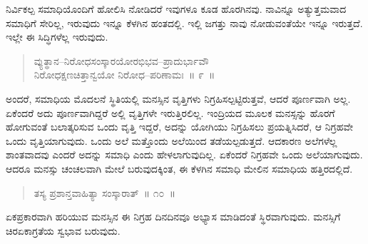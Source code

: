 \vspace{-0.4cm}


\vspace{0.1cm}

ನಿರ್ವಿಕಲ್ಪ ಸಮಾಧಿಯೊಂದಿಗೆ ಹೋಲಿಸಿ ನೋಡಿದರೆ ಇವುಗಳೂ ಕೂಡ ಹೊರಗಿನವು. ನಾವಿನ್ನೂ ಅತ್ಯುತ್ತಮವಾದ ಸಮಾಧಿಗೆ ಸೇರಿಲ್ಲ, ಇರುವುದು ಇನ್ನೂ ಕೆಳಗಿನ ಹಂತದಲ್ಲಿ. ಇಲ್ಲಿ ಜಗತ್ತು ನಾವು ನೋಡುವಂತೆಯೇ ಇನ್ನೂ ಇರುತ್ತದೆ. ಇಲ್ಲೇ ಈ ಸಿದ್ಧಿಗಳೆಲ್ಲ ಇರುವುದು. 

\vspace{-0.3cm}

\begin{verse}
ವ್ಯುತ್ಥಾನ–ನಿರೋಧಸಂಸ್ಕಾರಯೋರಭಿಭವ–ಪ್ರಾದುರ್ಭಾವೌ\\ನಿರೋಧಕ್ಷಣಚಿತ್ತಾನ್ವಯೋ ನಿರೋಧ–ಪರಿಣಾಮಃ~॥ ೯~॥
\end{verse}

\vspace{-0.35cm}


\vspace{0.1cm}

ಅಂದರೆ, ಸಮಾಧಿಯ ಮೊದಲನೆ ಸ್ಥಿತಿಯಲ್ಲಿ ಮನಸ್ಸಿನ ವೃತ್ತಿಗಳು ನಿಗ್ರಹಿಸಲ್ಪಟ್ಟಿರುತ್ತವೆ, ಆದರೆ ಪೂರ್ಣವಾಗಿ ಅಲ್ಲ. ಏಕೆಂದರೆ ಅದು ಪೂರ್ಣವಾಗಿದ್ದರೆ ಅಲ್ಲಿ ವೃತ್ತಿಗಳೇ ಇರುತ್ತಿರಲಿಲ್ಲ. ಇಂದ್ರಿಯದ ಮೂಲಕ ಮನಸ್ಸನ್ನು ಹೊರಗೆ ಹೋಗುವಂತೆ ಬಲಾತ್ಕರಿಸುವ ಒಂದು ವೃತ್ತಿ ಇದ್ದರೆ, ಅದನ್ನು ಯೋಗಿಯು ನಿಗ್ರಹಿಸಲು ಪ್ರಯತ್ನಿಸಿದರೆ, ಆ ನಿಗ್ರಹವೇ ಒಂದು ವೃತ್ತಿಯಾಗುವುದು. ಒಂದು ಅಲೆ ಮತ್ತೊಂದು ಅಲೆಯಿಂದ ತಡೆಯಲ್ಪಡುತ್ತದೆ. ಆದಕಾರಣ ಅಲೆಗಳೆಲ್ಲ ಶಾಂತವಾದವು ಎಂದರೆ ಅದನ್ನು ಸಮಾಧಿ ಎಂದು ಹೇಳಲಾಗುವುದಿಲ್ಲ. ಏಕೆಂದರೆ ನಿಗ್ರಹವೇ ಒಂದು ಅಲೆಯಾಗುವುದು. ಆದರೂ ಮನಸ್ಸು ಚಂಚಲವಾಗಿ ಮೇಲೆ ಬರುವುದಕ್ಕಿಂತ, ಈ ಕೆಳಗಿನ ಸಮಾಧಿ ಮೇಲಿನ ಸಮಾಧಿಯ ಹತ್ತಿರದಲ್ಲಿದೆ. 

\vspace{-0.25cm}

\begin{verse}
ತಸ್ಯ ಪ್ರಶಾನ್ತವಾಹಿತ್ಯಾ ಸಂಸ್ಕಾರಾತ್​~॥ ೧೦~॥
\end{verse}

\vspace{-0.42cm}


\vspace{0.1cm}

ಏಕಪ್ರಕಾರವಾಗಿ ಹರಿಯುವ ಮನಸ್ಸಿನ ಈ ನಿಗ್ರಹ ದಿನದಿನವೂ ಅಭ್ಯಾಸ ಮಾಡಿದಂತೆ ಸ್ಥಿರವಾಗುವುದು. ಮನಸ್ಸಿಗೆ ಚಿರಏಕಾಗ್ರತೆಯ ಸ್ವಭಾವ ಬರುವುದು. 

